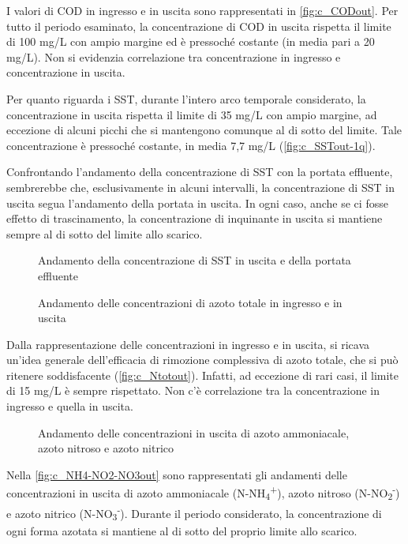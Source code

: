 I valori di COD in ingresso e in uscita sono rappresentati in \autoref{fig:c_CODout}.
Per tutto il periodo esaminato, la concentrazione di COD in uscita rispetta il limite di 100 mg/L con ampio margine ed è pressoché costante (in media pari a 20 mg/L).
Non si evidenzia correlazione tra concentrazione in ingresso e concentrazione in uscita.

Per quanto riguarda i SST, durante l’intero arco temporale considerato, la concentrazione in uscita rispetta il limite di 35 mg/L con ampio margine, ad eccezione di alcuni picchi che si mantengono comunque al di sotto del limite. Tale concentrazione è pressoché costante, in media 7,7 mg/L (\autoref{fig:c_SSTout-1q}).

Confrontando l’andamento della concentrazione di SST con la portata effluente, sembrerebbe che, esclusivamente in alcuni intervalli, la concentrazione di SST in uscita segua l'andamento della portata in uscita. In ogni caso, anche se ci fosse effetto di trascinamento, la concentrazione di inquinante in uscita si mantiene sempre al di sotto del limite allo scarico.
\begin{figure}[H]
		\centering
	\caption{Andamento della concentrazione di SST in uscita e della portata effluente}
	\label{fig:c_SSTout-1q}
\end{figure}
\begin{figure}[H]
		\centering
	\caption{Andamento delle concentrazioni di azoto totale in  ingresso e in uscita}
	\label{fig:c_Ntotout}
\end{figure}

Dalla rappresentazione delle concentrazioni in ingresso e in uscita, si ricava un’idea generale dell’efficacia di rimozione complessiva di azoto totale, che si può ritenere soddisfacente (\autoref{fig:c_Ntotout}). Infatti, ad eccezione di rari casi, il limite di 15 mg/L è sempre rispettato. Non c’è correlazione tra la concentrazione in ingresso e quella in uscita.

\begin{figure}[H]
		\centering
	\caption{Andamento delle concentrazioni in uscita di azoto ammoniacale, azoto nitroso e azoto nitrico}
	\label{fig:c_NH4-NO2-NO3out}
\end{figure}

Nella \autoref{fig:c_NH4-NO2-NO3out} sono rappresentati gli andamenti delle concentrazioni in uscita di azoto ammoniacale (N-NH\textsubscript{4}\textsuperscript{+}), azoto nitroso (N-NO\textsubscript{2}\textsuperscript{-}) e azoto nitrico (N-NO\textsubscript{3}\textsuperscript{-}).
Durante il periodo considerato, la concentrazione di ogni forma azotata si mantiene al di sotto del proprio limite allo scarico.

